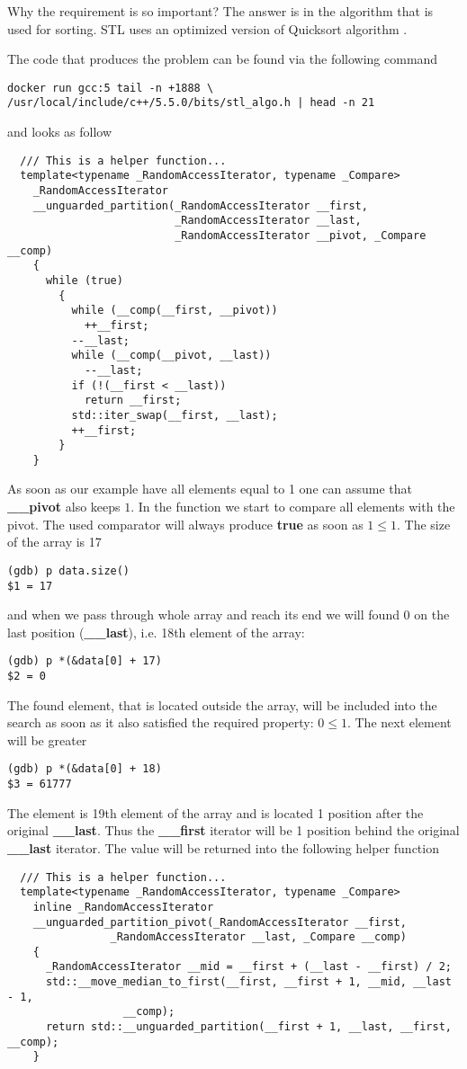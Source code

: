 \documentclass[14pt,a4paper]{article}
\begin{document}
Why the requirement is so important? The answer is in the algorithm
that is used for sorting. STL uses an optimized version of Quicksort algorithm
\cite{wiki:quicksort}. 

The code that produces the problem can be found via the following command
\begin{verbatim}
docker run gcc:5 tail -n +1888 \
/usr/local/include/c++/5.5.0/bits/stl_algo.h | head -n 21
\end{verbatim}
and looks as follow
\begin{verbatim}
  /// This is a helper function...
  template<typename _RandomAccessIterator, typename _Compare>
    _RandomAccessIterator
    __unguarded_partition(_RandomAccessIterator __first,
                          _RandomAccessIterator __last,
                          _RandomAccessIterator __pivot, _Compare __comp)
    {
      while (true)
        {
          while (__comp(__first, __pivot))
            ++__first;
          --__last;
          while (__comp(__pivot, __last))
            --__last;
          if (!(__first < __last))
            return __first;
          std::iter_swap(__first, __last);
          ++__first;
        }
    }
\end{verbatim}
As soon as our example have all elements equal to 1 one can assume
that \textbf{\_\_pivot} also keeps $1$. In the function we start to
compare all elements with the pivot. The used comparator will always
produce \textbf{true} as soon 
as $1 \le 1$. The size of the array is 17 
\begin{verbatim}
(gdb) p data.size()
$1 = 17
\end{verbatim}
and when we pass through whole array and reach its end we
will found $0$ on the last position (\textbf{\_\_last}), i.e. 18th
element of the array: 
\begin{verbatim}
(gdb) p *(&data[0] + 17)
$2 = 0
\end{verbatim}
The found element, that is located outside the array, will be
included into the search as soon as it also satisfied the required
property: $0 \le 1$. The next element will be greater  
\begin{verbatim}
(gdb) p *(&data[0] + 18)
$3 = 61777
\end{verbatim}
The element is 19th element of the array and is located 1 position
after the original \textbf{\_\_last}. Thus the \textbf{\_\_first}
iterator will be 1 position behind the original \textbf{\_\_last}
iterator. The value will be returned into the following helper
function 
\begin{verbatim}
  /// This is a helper function...
  template<typename _RandomAccessIterator, typename _Compare>
    inline _RandomAccessIterator
    __unguarded_partition_pivot(_RandomAccessIterator __first,
				_RandomAccessIterator __last, _Compare __comp)
    {
      _RandomAccessIterator __mid = __first + (__last - __first) / 2;
      std::__move_median_to_first(__first, __first + 1, __mid, __last - 1,
				  __comp);
      return std::__unguarded_partition(__first + 1, __last, __first, __comp);
    }
\end{verbatim}
\end{document}
